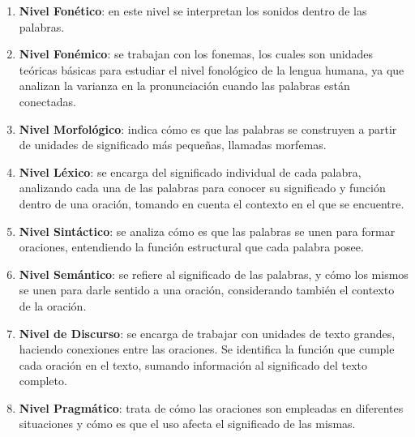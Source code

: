 \begin{enumerate}[label=\alph*.]
    \item \textbf{Nivel Fonético}: en este nivel se interpretan los sonidos dentro de las palabras.
    \item \textbf{Nivel Fonémico}: se trabajan con los fonemas, los cuales son unidades teóricas básicas para estudiar el nivel fonológico de la lengua humana, ya que analizan la varianza en la pronunciación cuando las palabras están conectadas.
    \item \textbf{Nivel Morfológico}: indica cómo es que las palabras se construyen a partir de unidades de significado más pequeñas, llamadas morfemas.
    \item \textbf{Nivel Léxico}: se encarga del significado individual de cada palabra, analizando cada una de las palabras para conocer su significado y función dentro de una oración, tomando en cuenta el contexto en el que se encuentre.
    \item \textbf{Nivel Sintáctico}: se analiza cómo es que las palabras se unen para formar oraciones, entendiendo la función estructural que cada palabra posee.
    \item \textbf{Nivel Semántico}: se refiere al significado de las palabras, y cómo los mismos se unen para darle sentido a una oración, considerando también el contexto de la oración.
    \item \textbf{Nivel de Discurso}: se encarga de trabajar con unidades de texto grandes, haciendo conexiones entre las oraciones. Se identifica la función que cumple cada oración en el texto, sumando información al significado del texto completo.
    \item \textbf{Nivel Pragmático}: trata de cómo las oraciones son empleadas en diferentes situaciones y cómo es que el uso afecta el significado de las mismas.
\end{enumerate}

